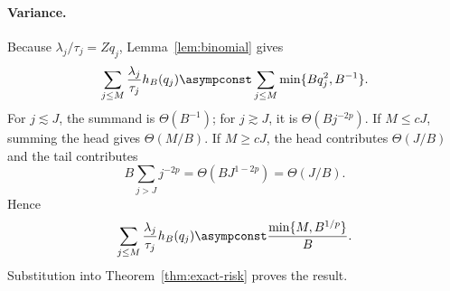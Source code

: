 \paragraph{Variance.}
Because $\lambda_j/\tau_j=Zq_j$, Lemma~\ref{lem:binomial} gives
\begin{equation}
\sum_{j\le M}\frac{\lambda_j}{\tau_j}h_B(q_j)
\asympconst
\sum_{j\le M}\min\{Bq_j^2,B^{-1}\}.
\label{eq:variance-reduction}
\end{equation}
For $j\lesssim J$, the summand is $\Theta(B^{-1})$; for $j\gtrsim J$, it is
$\Theta(Bj^{-2p})$. If $M\le cJ$, summing the head gives
$\Theta(M/B)$. If $M\ge cJ$, the head contributes $\Theta(J/B)$ and the tail
contributes
\[
B\sum_{j>J}j^{-2p}
=\Theta(BJ^{1-2p})
=\Theta(J/B).
\]
Hence
\begin{equation}
\sum_{j\le M}\frac{\lambda_j}{\tau_j}h_B(q_j)
\asympconst\frac{\min\{M,B^{1/p}\}}{B}.
\label{eq:variance-rate}
\end{equation}
Substitution into Theorem~\ref{thm:exact-risk} proves the result.

